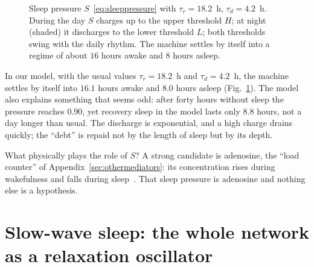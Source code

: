 \begin{figure}[t]
\centering
{}
\caption{Sleep pressure $S$~\eqref{eq:sleeppressure} with $\tau_r=18.2$~h, $\tau_d=4.2$~h. During the day $S$ charges up to the upper threshold $H$; at night (shaded) it discharges to the lower threshold $L$; both thresholds swing with the daily rhythm. The machine settles by itself into a regime of about $16$ hours awake and $8$ hours asleep.}
\label{fig:twoprocess}
\end{figure}

In our model, with the usual values $\tau_r=18.2$~h and $\tau_d=4.2$~h, the machine settles by itself into $16.1$ hours awake and $8.0$ hours asleep (Fig.~\ref{fig:twoprocess}). The model also explains something that seems odd: after forty hours without sleep the pressure reaches $0.90$, yet recovery sleep in the model lasts only $8.8$ hours, not a day longer than usual. The discharge is exponential, and a high charge drains quickly; the ``debt'' is repaid not by the length of sleep but by its depth.

What physically plays the role of $S$? A strong candidate is adenosine, the ``load counter'' of Appendix~\ref{sec:othermediators}: its concentration rises during wakefulness and falls during sleep~\cite{PorkkaHeiskanen1997,Dunwiddie2001}. That sleep pressure is adenosine and nothing else is a hypothesis.

\section{Slow-wave sleep: the whole network as a relaxation oscillator}

